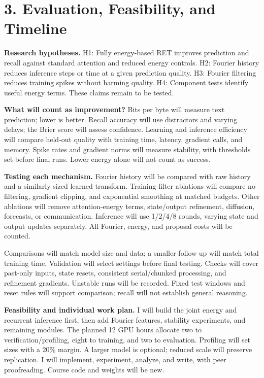 \documentclass[11pt,letterpaper]{article}
\begin{document}
\newpage
\section*{3. Evaluation, Feasibility, and Timeline}

\textbf{Research hypotheses.} H1: Fully energy-based RET improves prediction and recall against standard attention and reduced energy controls. H2: Fourier history reduces inference steps or time at a given prediction quality. H3: Fourier filtering reduces training spikes without harming quality. H4: Component tests identify useful energy terms. These claims remain to be tested.

\textbf{What will count as improvement?} Bits per byte will measure text prediction; lower is better. Recall accuracy will use distractors and varying delays; the Brier score will assess confidence. Learning and inference efficiency will compare held-out quality with training time, latency, gradient calls, and memory. Spike rates and gradient norms will measure stability, with thresholds set before final runs. Lower energy alone will not count as success.

\textbf{Testing each mechanism.} Fourier history will be compared with raw history and a similarly sized learned transform. Training-filter ablations will compare no filtering, gradient clipping, and exponential smoothing at matched budgets. Other ablations will remove attention-energy terms, state/output refinement, diffusion, forecasts, or communication. Inference will use 1/2/4/8 rounds, varying state and output updates separately. All Fourier, energy, and proposal costs will be counted.

Comparisons will match model size and data; a smaller follow-up will match total training time. Validation will select settings before final testing. Checks will cover past-only inputs, state resets, consistent serial/chunked processing, and refinement gradients. Unstable runs will be recorded. Fixed test windows and reset rules will support comparison; recall will not establish general reasoning.

\textbf{Feasibility and individual work plan.} I will build the joint energy and recurrent inference first, then add Fourier features, stability experiments, and remaining modules. The planned 12 GPU hours allocate two to verification/profiling, eight to training, and two to evaluation. Profiling will set sizes with a 20\% margin. A larger model is optional; reduced scale will preserve replication. I will implement, experiment, analyze, and write, with peer proofreading. Course code and weights will be new.
\end{document}
